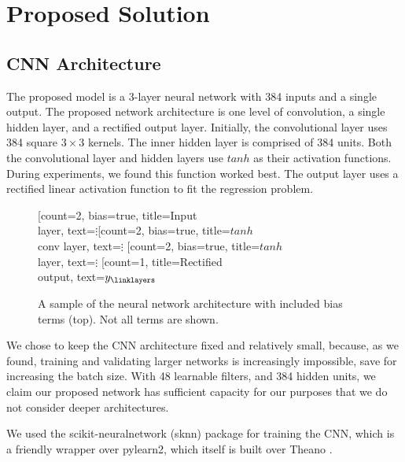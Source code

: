 \documentclass{article}
\begin{document}
\section{Proposed Solution}

\subsection{CNN Architecture}

The proposed model is a 3-layer neural network with 384 inputs and a single output.  The proposed network architecture is one level of convolution, a single hidden layer, and a rectified output layer.  Initially, the convolutional layer uses 384 square $3\times3$ kernels.  The inner hidden layer is comprised of 384 units.  Both the convolutional layer and hidden layers use $tanh$ as their activation functions.  During experiments, we found this function worked best.  The output layer uses a rectified linear activation function to fit the regression problem.

\begin{figure}[ht]
\centering
\begin{neuralnetwork}[height=4]
	\newcommand{\nodetexty}[2]{$y_#2$}
	\newcommand{\mynodetext}[2]{$\vdots$}
	\setdefaultnodetext{\mynodetext}
	[count=2, bias=true, title=Input\\layer, text=\mynodetext]
	\hiddenlayer[count=2, bias=true, title=$tanh$\\conv layer, text=\mynodetext] \linklayers
	\hiddenlayer[count=2, bias=true, title=$tanh$\\layer, text=\mynodetext] \linklayers
	\outputlayer[count=1, title=Rectified\\output, text=\nodetexty] \linklayers
\end{neuralnetwork}
\caption{A sample of the neural network architecture with included bias terms (top).  Not all terms are shown.}
\end{figure}

We chose to keep the CNN architecture fixed and relatively small, because, as we found, training and validating larger networks is increasingly impossible, save for increasing the batch size.  With 48 learnable filters, and 384 hidden units, we claim our proposed network has sufficient capacity for our purposes that we do not consider deeper architectures.

We used the scikit-neuralnetwork (sknn) package for training the CNN, which is a friendly wrapper over pylearn2, which itself is built over Theano \cite{theano}.
\end{document}
